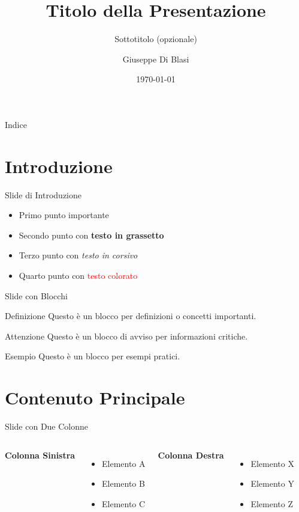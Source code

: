 \documentclass[aspectratio=169]{beamer}
\title{Titolo della Presentazione}
\subtitle{Sottotitolo (opzionale)}
\author{Giuseppe Di Blasi}
\institute{Università degli studi di Parma}
\date{\today}
\begin{document}
\begin{frame}
\titlepage
\end{frame}

\begin{frame}{Indice}
\tableofcontents
\end{frame}

\section{Introduzione}

\begin{frame}{Slide di Introduzione}
\begin{itemize}
    \item Primo punto importante
    \item Secondo punto con \textbf{testo in grassetto}
    \item Terzo punto con \textit{testo in corsivo}
    \item Quarto punto con \textcolor{red}{testo colorato}
\end{itemize}
\end{frame}

\begin{frame}{Slide con Blocchi}
\begin{block}{Definizione}
Questo è un blocco per definizioni o concetti importanti.
\end{block}

\begin{alertblock}{Attenzione}
Questo è un blocco di avviso per informazioni critiche.
\end{alertblock}

\begin{exampleblock}{Esempio}
Questo è un blocco per esempi pratici.
\end{exampleblock}
\end{frame}

\section{Contenuto Principale}

\begin{frame}{Slide con Due Colonne}
\begin{columns}
\textbf{Colonna Sinistra}
\begin{itemize}
    \item Elemento A
    \item Elemento B
    \item Elemento C
\end{itemize}

\textbf{Colonna Destra}
\begin{itemize}
    \item Elemento X
    \item Elemento Y
    \item Elemento Z
\end{itemize}
\end{columns}
\end{frame}
\end{document}
